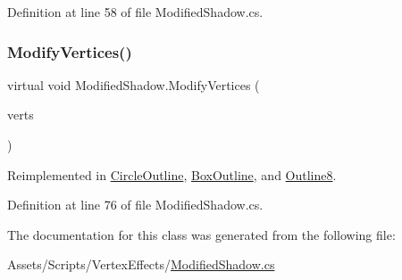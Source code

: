 Definition at line 58 of file Modified\+Shadow.\+cs.

\mbox{\label{class_modified_shadow_ac1651effd229c1fd2f454eccc2cf225c}} 
\subsubsection{\texorpdfstring{Modify\+Vertices()}{ModifyVertices()}}
{\footnotesize\ttfamily virtual void Modified\+Shadow.\+Modify\+Vertices (\begin{DoxyParamCaption}\item[{List$<$ U\+I\+Vertex $>$}]{verts }\end{DoxyParamCaption})\hspace{0.3cm}{\ttfamily [virtual]}}



Reimplemented in \mbox{\hyperlink{class_circle_outline_a60ecaf1389896d2bca9b38c8767ca20a}{Circle\+Outline}}, \mbox{\hyperlink{class_box_outline_a2f73aa9d45a23d039aeff7a33a322019}{Box\+Outline}}, and \mbox{\hyperlink{class_outline8_a519d28a745afb06c930d467a308c49dc}{Outline8}}.



Definition at line 76 of file Modified\+Shadow.\+cs.



The documentation for this class was generated from the following file\+:\begin{DoxyCompactItemize}
\item 
Assets/\+Scripts/\+Vertex\+Effects/\mbox{\hyperlink{_modified_shadow_8cs}{Modified\+Shadow.\+cs}}\end{DoxyCompactItemize}
